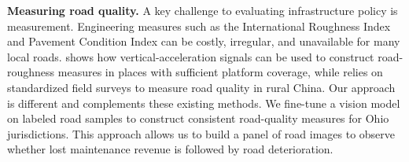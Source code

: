 {\bf Measuring road quality.} A key challenge to evaluating infrastructure policy is measurement. Engineering measures such as the International Roughness Index and Pavement Condition Index can be costly, irregular, and unavailable for many local roads. \cite{currier2023} shows how vertical-acceleration signals can be used to construct road-roughness measures in places with sufficient platform coverage, while \cite{wong2017local} relies on standardized field surveys to measure road quality in rural China. Our approach is different and complements these existing methods. We fine-tune a vision model on labeled road samples to construct consistent road-quality measures for Ohio jurisdictions. This approach allows us to build a panel of road images to observe whether lost maintenance revenue is followed by road deterioration.

